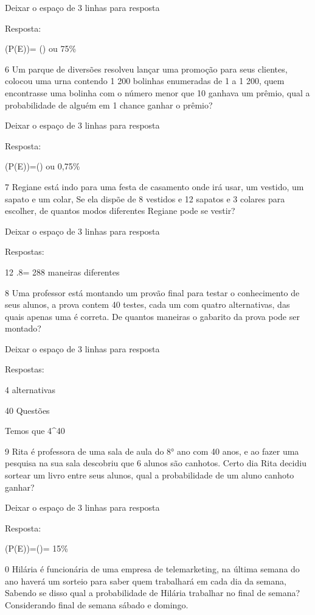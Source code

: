 Deixar o espaço de 3 linhas para resposta

Resposta:

(P(E))= () ou 75\%

\num{6} Um parque de diversões resolveu lançar uma promoção para seus
clientes, colocou uma urna contendo 1 200 bolinhas enumeradas de 1 a 1
200, quem encontrasse uma bolinha com o número menor que 10 ganhava um
prêmio, qual a probabilidade de alguém em 1 chance ganhar o prêmio?

Deixar o espaço de 3 linhas para resposta

Resposta:

(P(E))=() ou 0,75\%

\num{7} Regiane está indo para uma festa de casamento onde irá usar, um
vestido, um sapato e um colar, Se ela dispõe de 8 vestidos e 12 sapatos
e 3 colares para escolher, de quantos modos diferentes Regiane pode se
vestir?

Deixar o espaço de 3 linhas para resposta

Respostas:

12 .8= 288 maneiras diferentes

\num{8} Uma professor está montando um provão final para testar o
conhecimento de seus alunos, a prova contem 40 testes, cada um com
quatro alternativas, das quais apenas uma é correta. De quantos maneiras
o gabarito da prova pode ser montado?

Deixar o espaço de 3 linhas para resposta

Respostas:

4 alternativas

40 Questões

Temos que 4^40

\num{9} Rita é professora de uma sala de aula do 8° ano com 40 anos, e ao
fazer uma pesquisa na sua sala descobriu que 6 alunos são canhotos.
Certo dia Rita decidiu sortear um livro entre seus alunos, qual a
probabilidade de um aluno canhoto ganhar?

Deixar o espaço de 3 linhas para resposta

Resposta:

(P(E))=()= 15\%

\num{0} Hilária é funcionária de uma empresa de telemarketing, na última
semana do ano haverá um sorteio para saber quem trabalhará em cada dia
da semana, Sabendo se disso qual a probabilidade de Hilária trabalhar no
final de semana? Considerando final de semana sábado e domingo.


